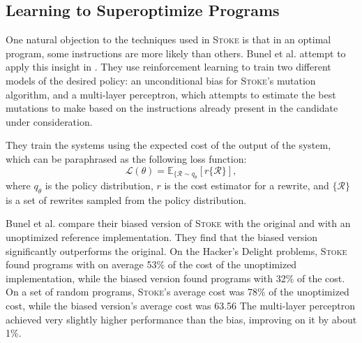 \documentclass[12pt,twoside]{reedthesis}
\begin{document}
        \subsection{Learning to Superoptimize Programs}
            One natural objection to the techniques used in \textsc{Stoke} is that in an optimal program, some instructions are more likely than others.
            Bunel et al. attempt to apply this insight in \cite{bunel2017learning}.
            They use reinforcement learning to train two different models of the desired policy:
                an unconditional bias for \textsc{Stoke}'s mutation algorithm,
                and a multi-layer perceptron\footnotemark,
                    which attempts to estimate the best mutations to make based on the instructions already present in the candidate under consideration.
            
            They train the systems using the expected cost of the output of the system, which can be paraphrased as the following loss function:
            \[
                \mathcal{L}(\theta) = \mathbb{E}_{\{\mathcal{R}\sim q_\theta}[r\{\mathcal{R}\}],
            \]
            where $q_\theta$ is the policy distribution, $r$ is the cost estimator for a rewrite, and $\{\mathcal{R}\}$ is a set of rewrites sampled from the policy distribution.
            
            Bunel et al. compare their biased version of \textsc{Stoke} with the original and with an unoptimized reference implementation.
            They find that the biased version significantly outperforms the original.
            On the Hacker's Delight problems, \textsc{Stoke} found programs with on average 53\% of the cost of the unoptimized implementation, while the biased version found programs with 32\% of the cost.
            On a set of random programs, \textsc{Stoke}'s average cost was 78\% of the unoptimized cost, while the biased version's average cost was 63.56%
            The multi-layer perceptron achieved very slightly higher performance than the bias, improving on it by about 1\%.
\end{document}
